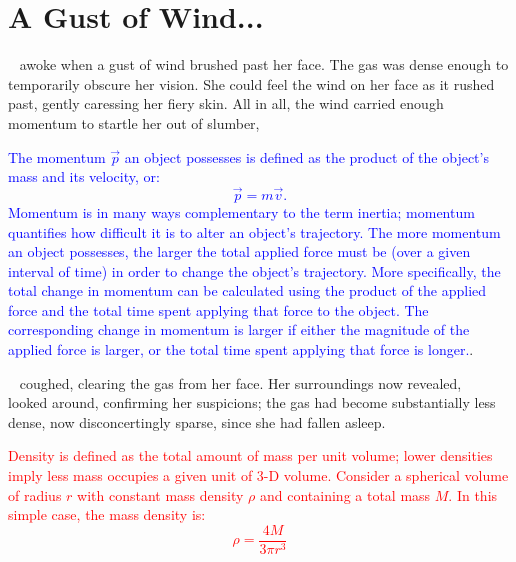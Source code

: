 \documentclass[main.tex]{subfiles}
\begin{document}

\chapter{A Gust of Wind...}

\par \nar \rmsterope~ awoke when a gust of wind brushed past her face.  The gas was dense enough to temporarily obscure her vision.  She could feel the wind on her face as it rushed past, gently caressing her fiery skin.  All in all, the wind carried enough momentum to startle her out of slumber,

\begin{tcolorbox}[sharp corners, colback=blue!30, colframe=blue!80!blue, title=Linear Momentum]
\par \textcolor{blue} {The momentum $\vec{p}$ an object possesses is defined as the product of the object's mass and its velocity, or:
\begin{equation}
\vec{p} = m\vec{v}.
\end{equation}
Momentum is in many ways complementary to the term inertia; momentum quantifies how difficult it is to alter an object's trajectory.  The more momentum an object possesses, the larger the total applied force must be (over a given interval of time) in order to change the object's trajectory.  More specifically, the total change in momentum can be calculated using the product of the applied force and the total time spent applying that force to the object.  The corresponding change in momentum is larger if either the magnitude of the applied force is larger, or the total time spent applying that force is longer.}.  
\end{tcolorbox}

\par \nar \rmsterope~ coughed, clearing the gas from her face.  Her surroundings now revealed, \rmsterope~ looked around, confirming her suspicions; the gas had become substantially less dense, now disconcertingly sparse, since she had fallen asleep. 

\begin{tcolorbox}[sharp corners, colback=red!30, colframe=red!80!blue, title=Mass Density]
\par \textcolor{red} {\nar Density is defined as the total amount of mass per unit volume; lower densities imply less mass occupies a given unit of 3-D volume.  Consider a spherical volume of radius $r$ with constant mass density $\rho$ and containing a total mass $M$.  In this simple case, the mass density is:
\begin{equation}
\rho = \frac{4M}{3{\pi}r^3}
\end{equation}
}  
\end{tcolorbox}
\end{document}
